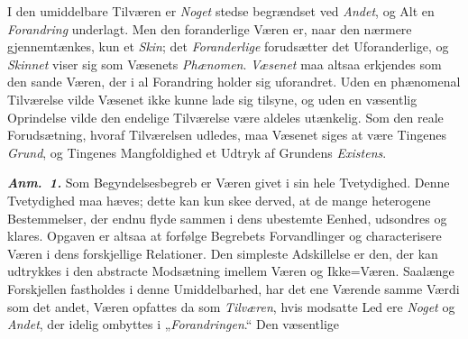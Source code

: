 \documentclass[12pt]{book}
\newcommand{\anm}[1]{\emph{\textbf{Anm.~#1.}}}
\newcommand{\opage}[1]{\marginnote{\footnotesize\textit{[#1]}}}
\begin{document}
\noindent I den umiddelbare Tilværen er \emph{Noget} stedse begrændset ved
\emph{Andet}, og Alt en \emph{Forandring} underlagt. Men den foranderlige Væren er,
naar den nærmere gjennemtænkes, kun et \emph{Skin}; det \emph{Foranderlige}
forudsætter det Uforanderlige, og \emph{Skinnet} viser sig som Væsenets
\emph{Phænomen}. \emph{Væsenet} maa altsaa erkjendes som den sande Væren, der i al
Forandring holder sig uforandret. Uden en phænomenal Tilværelse vilde Væsenet ikke
kunne lade sig tilsyne, og uden en væsentlig Oprindelse vilde den endelige Tilværelse
være aldeles utænkelig. Som den reale Forudsætning, hvoraf Tilværelsen udledes, maa
Væsenet siges at være Tingenes \emph{Grund}, og Tingenes Mangfoldighed et Udtryk af
Grundens \emph{Existens}.

\anm{1} Som Begyndelsesbegreb er Væren givet i sin hele Tvetydighed. Denne
Tvetydighed maa hæves; dette kan kun skee derved, at de mange heterogene
Bestemmelser, der endnu flyde sammen i dens ubestemte Eenhed, udsondres og klares.
Opgaven er altsaa at forfølge Begrebets Forvandlinger og characterisere Væren i dens
forskjellige Relationer. Den simpleste Adskillelse er den, der kan udtrykkes i den
abstracte Modsætning imellem Væren og Ikke=Væren. Saalænge Forskjellen fastholdes i
denne Umiddelbarhed, har det ene Værende samme Værdi som det andet, Væren opfattes da
som \emph{Tilværen}, hvis modsatte Led ere \emph{Noget} og \emph{Andet}, der idelig
ombyttes i „\emph{Forandringen}.“ Den væsentlige
\opage{115} %
\end{document}
